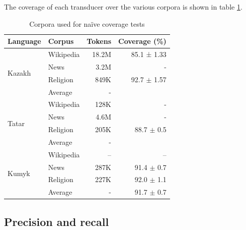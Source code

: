 \documentclass[a4paper,11pt,twocolumn]{article}
\begin{document}



The coverage of each transducer over the various corpora is shown in table \ref{table:corpora}.

\begin{table}
\begin{center}
\begin{tabular}{llrr}
\toprule
\textbf{Language} & \textbf{Corpus} & \textbf{Tokens} & \textbf{Coverage} (\%) \\
\midrule
\multirow{4}{*}{Kazakh} & Wikipedia & 18.2M &  85.1 ± 1.33 \\
	& News & 3.2M & - \\
	& Religion & 849K & 92.7 $\pm$ 1.57 \\\cline{2-4}
	& Average & - &  \\
\midrule
\multirow{4}{*}{Tatar} & Wikipedia & 128K &  - \\
	& News & 4.6M & - \\
	& Religion & 205K & 88.7 $\pm$ 0.5 \\\cline{2-4}
	& Average & - &  \\
\midrule
\multirow{4}{*}{Kumyk} & Wikipedia & -- & -- \\
        & News & 287K &  91.4 $\pm$ 0.7 \\
	& Religion & 227K & 92.0 $\pm$ 1.1 \\\cline{2-4}
	& Average & - & 91.7 $\pm$ 0.7 \\
\bottomrule
\end{tabular}
 \caption{Corpora used for naïve coverage tests}
 \label{table:corpora}
\end{center}
\end{table}

\subsection{Precision and recall}
\end{document}
